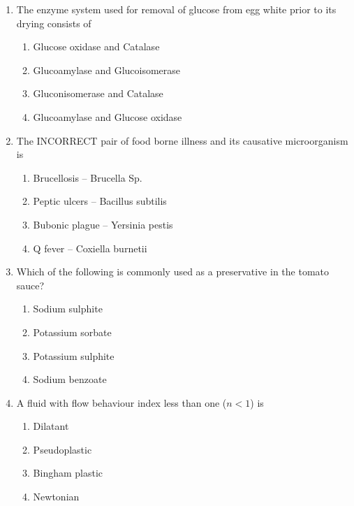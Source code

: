 \documentclass[journal,12pt,onecolumn]{IEEEtran}
\begin{document}
\begin{enumerate}[label=\arabic*.]
\item The enzyme system used for removal of glucose from egg white prior to its drying consists of
\begin{multicols}{2}
\begin{enumerate}[label=(\Alph*)]
\item Glucose oxidase and Catalase
\item Glucoamylase and Glucoisomerase
\item Gluconisomerase and Catalase
\item Glucoamylase and Glucose oxidase
\end{enumerate}
\end{multicols}

\item The INCORRECT pair of food borne illness and its causative microorganism is
\begin{multicols}{2}
\begin{enumerate}[label=(\Alph*)]
\item Brucellosis -- Brucella Sp.
\item Peptic ulcers -- Bacillus subtilis
\item Bubonic plague -- Yersinia pestis
\item Q fever -- Coxiella burnetii
\end{enumerate}
\end{multicols}

\item Which of the following is commonly used as a preservative in the tomato sauce?
\begin{multicols}{2}
\begin{enumerate}[label=(\Alph*)]
\item Sodium sulphite
\item Potassium sorbate
\item Potassium sulphite
\item Sodium benzoate
\end{enumerate}
\end{multicols}

\item A fluid with flow behaviour index less than one ($n < 1$) is
\begin{multicols}{2}
\begin{enumerate}[label=(\Alph*)]
\item Dilatant
\item Pseudoplastic
\item Bingham plastic
\item Newtonian
\end{enumerate}
\end{multicols}


\end{enumerate}
\end{document}
